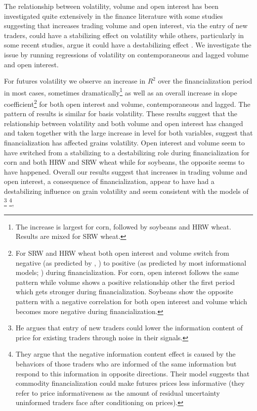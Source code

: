 \documentclass[12pt,]{article}
\let\rmarkdownfootnote\footnote%
\def\footnote{\protect\rmarkdownfootnote}
\begin{document}
The relationship between volatility, volume and open interest has been
investigated quite extensively in the finance literature with some
studies suggesting that increases trading volume and open interest, via
the entry of new traders, could have a stabilizing effect on volatility
\citep[\citet{kyle_continuous_1985},
\citet{stoll_program_1987}]{bessembinder_price_1993} while others,
particularly in some recent studies, argue it could have a destabilizing
effect \citep[\citet{singleton_investor_2013},
\citet{sockin_informational_2015}]{goldstein_information_2015}. We
investigate the issue by running regressions of volatility on
contemporaneous and lagged volume and open interest.

For futures volatility we observe an increase in \(R^{2}\) over the
financialization period in most cases, sometimes dramatically\footnote{The
  increase is largest for corn, followed by soybeans and HRW wheat.
  Results are mixed for SRW wheat.} as well as an overall increase in
slope coefficient\footnote{For SRW and HRW wheat both open interest and
  volume switch from negative (as predicted by
  \citet{kyle_continuous_1985}, \citet{stoll_program_1987}) to positive
  (as predicted by most informational models;
  \citet{karpoff_relation_1987}) during financialization. For corn, open
  interest follows the same pattern while volume shows a positive
  relationship other the first period which gets stronger during
  financialization. Soybeans show the opposite pattern with a negative
  correlation for both open interest and volume which becomes more
  negative during financialization.} for both open interest and volume,
contemporaneous and lagged. The pattern of results is similar for basis
volatility. These results suggest that the relationship between
volatility and both volume and open interest has changed and taken
together with the large increase in level for both variables, suggest
that financialization has affected grains volatility. Open interest and
volume seem to have switched from a stabilizing to a destabilizing role
during financialization for corn and both HRW and SRW wheat while for
soybeans, the opposite seems to have happened. Overall our results
suggest that increases in trading volume and open interest, a
consequence of financialization, appear to have had a destabilizing
influence on grain volatility and seem consistent with the models of
\citet{stein_informational_1987}\footnote{He argues that entry of new
  traders could lower the information content of price for existing
  traders through noise in their signals.}
\citet{goldstein_information_2015}\footnote{They argue that the negative
  information content effect is caused by the behaviors of those traders
  who are informed of the same information but respond to this
  information in opposite directions. Their model suggests that
  commodity financialization could make futures prices less informative
  (they refer to price informativeness as the amount of residual
  uncertainty uninformed traders face after conditioning on prices).},
\end{document}
